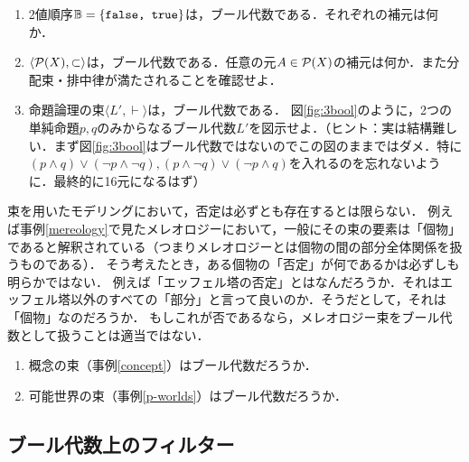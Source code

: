\documentclass[11pt,a4paper]{jsarticle}
\begin{document}
\begin{exercise}
 \begin{enumerate}
    \item 2値順序$\mathbb{B} = \{ \texttt{false, true} \}$は，ブール代数である．それぞれの補元は何か．
    \item $\langle \mathcal{P}(X), \subset \rangle$は，ブール代数である．任意の元$A \in \mathcal{P}(X)$の補元は何か．また分配束・排中律が満たされることを確認せよ．
    \item 命題論理の束$\langle L', \vdash \rangle$は，ブール代数である．
    図\ref{fig:3bool}のように，2つの単純命題$p, q$のみからなるブール代数$L'$を図示せよ．（ヒント：実は結構難しい．まず図\ref{fig:3bool}はブール代数ではないのでこの図のままではダメ．特に$(p \wedge q)\vee(\neg p \wedge \neg q), (p \wedge \neg q)\vee(\neg p \wedge q)$を入れるのを忘れないように．最終的に16元になるはず）%
 \end{enumerate}
\end{exercise}

束を用いたモデリングにおいて，否定は必ずとも存在するとは限らない．
例えば事例\ref{mereology}で見たメレオロジーにおいて，一般にその束の要素は「個物」であると解釈されている（つまりメレオロジーとは個物の間の部分全体関係を扱うものである）．
そう考えたとき，ある個物の「否定」が何であるかは必ずしも明らかではない．
例えば「エッフェル塔の否定」とはなんだろうか．それはエッフェル塔以外のすべての「部分」と言って良いのか．そうだとして，それは「個物」なのだろうか．
もしこれが否であるなら，メレオロジー束をブール代数として扱うことは適当ではない．

\begin{exercise}
    \begin{enumerate}
        \item 概念の束（事例\ref{concept}）はブール代数だろうか．
        \item 可能世界の束（事例\ref{p-worlds}）はブール代数だろうか．
    \end{enumerate}
\end{exercise}

\subsection{ブール代数上のフィルター}
\end{document}
